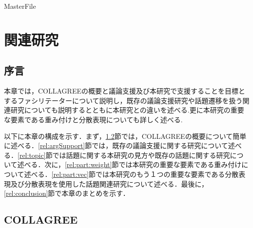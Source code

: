 \expandafter\ifx\csname MasterFile\endcsname\relax
	\def\SubFile{hoge}
	
	
	\setcounter{chapter}{1}
  \fi
  \cleardoublepage
\chapter{関連研究}
\label{relwork:chapter}

\section{序言}
\label{relwork:introduction}
本章では，COLLAGREEの概要と議論支援及び本研究で支援することを目標とするファシリテーターについて説明し，既存の議論支援研究や話題遷移を扱う関連研究についても説明するとともに本研究との違いを述べる.更に本研究の重要な要素である重み付けと分散表現についても詳しく述べる.

以下に本章の構成を示す．まず，\ref{rel:collagree}節では，COLLAGREEの概要について簡単に述べる．\ref{rel:argSupport}節では，既存の議論支援に関する研究について述べる．\ref{rel:topic}節では話題に関する本研究の見方や既存の話題に関する研究について述べる．次に，\ref{rel:part:weight}節では本研究の重要な要素である重み付けについて述べる．\ref{rel:part:vec}節では本研究のもう１つの重要な要素である分散表現及び分散表現を使用した話題関連研究について述べる．最後に，\ref{rel:conclusion}節で本章のまとめを示す．

\clearpage
\section{COLLAGREE}
\label{rel:collagree}
